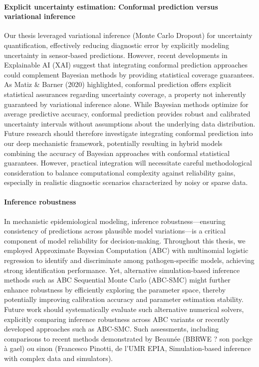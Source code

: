 \paragraph{Explicit uncertainty estimation: Conformal prediction versus variational inference} Our thesis leveraged variational inference (Monte Carlo Dropout) for uncertainty quantification, effectively reducing diagnostic error by explicitly modeling uncertainty in sensor-based predictions. However, recent developments in Explainable AI (XAI) suggest that integrating conformal prediction approaches could complement Bayesian methods by providing statistical coverage guarantees. As Matiz \& Barner (2020) highlighted, conformal prediction offers explicit statistical assurances regarding uncertainty coverage, a property not inherently guaranteed by variational inference alone. While Bayesian methods optimize for average predictive accuracy, conformal prediction provides robust and calibrated uncertainty intervals without assumptions about the underlying data distribution. Future research should therefore investigate integrating conformal prediction into our deep mechanistic framework, potentially resulting in hybrid models combining the accuracy of Bayesian approaches with conformal statistical guarantees. However, practical integration will necessitate careful methodological consideration to balance computational complexity against reliability gains, especially in realistic diagnostic scenarios characterized by noisy or sparse data.



\paragraph{Inference robustness} In mechanistic epidemiological modeling, inference robustness—ensuring consistency of predictions across plausible model variations—is a critical component of model reliability for decision-making. Throughout this thesis, we employed Approximate Bayesian Computation (ABC) with multinomial logistic regression to identify and discriminate among pathogen-specific models, achieving strong identification performance. Yet, alternative simulation-based inference methods such as ABC Sequential Monte Carlo (ABC-SMC) might further enhance robustness by efficiently exploring the parameter space, thereby potentially improving calibration accuracy and parameter estimation stability. Future work should systematically evaluate such alternative numerical solvers, explicitly comparing inference robustness across ABC variants or recently developed approaches such as ABC-SMC. Such assessments, including comparisons to recent methods demonstrated by Beaunée (BBRWE ? son packge à gael) ou sinon (Francesco Pinotti, de l'UMR EPIA, Simulation-based inference with complex data and simulators).

